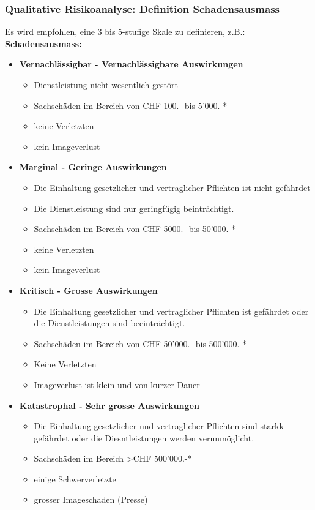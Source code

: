 \documentclass[10pt,a4paper]{article}
\begin{document}
\pagebreak
\subsubsection*{Qualitative Risikoanalyse: Definition Schadensausmass} Es wird empfohlen, eine 3 bis 5-stufige Skale zu definieren, z.B.: \\
\textbf{Schadensausmass:}
\begin{itemize}[noitemsep,topsep=0pt,leftmargin=*]
    \item \textbf{Vernachlässigbar - Vernachlässigbare Auswirkungen}
    \begin{itemize}[noitemsep,topsep=0pt,leftmargin=*]
        \item Dienstleistung nicht wesentlich gestört
        \item Sachschäden im Bereich von CHF 100.- bis 5'000.-*
        \item keine Verletzten
        \item kein Imageverlust
    \end{itemize}
    \item \textbf{Marginal - Geringe Auswirkungen}
    \begin{itemize}[noitemsep,topsep=0pt,leftmargin=*]
        \item Die Einhaltung gesetzlicher und vertraglicher Pflichten ist nicht gefährdet
        \item Die Dienstleistung sind nur geringfügig beinträchtigt.
        \item Sachschäden im  Bereich von CHF 5000.- bis 50'000.-*
        \item keine Verletzten
        \item kein Imageverlust
    \end{itemize}
    \item \textbf{Kritisch - Grosse Auswirkungen}
    \begin{itemize}[noitemsep,topsep=0pt,leftmargin=*]
        \item Die Einhaltung gesetzlicher und vertraglicher Pflichten ist gefährdet oder die Dienstleistungen sind beeinträchtigt.
        \item Sachschäden im Bereich von CHF 50'000.- bis  500'000.-*
        \item Keine Verletzten
        \item Imageverlust ist klein und von kurzer Dauer
    \end{itemize}
    \item \textbf{Katastrophal - Sehr grosse Auswirkungen}
    \begin{itemize}[noitemsep,topsep=0pt,leftmargin=*]
        \item Die Einhaltung gesetzlicher und vertraglicher Pflichten sind starkk gefährdet oder die Diesntleistungen werden verunmöglicht.
        \item Sachschäden im Bereich \textgreater CHF 500'000.-*
        \item einige Schwerverletzte
        \item grosser Imageschaden (Presse)
    \end{itemize}
\end{itemize}
\end{document}
